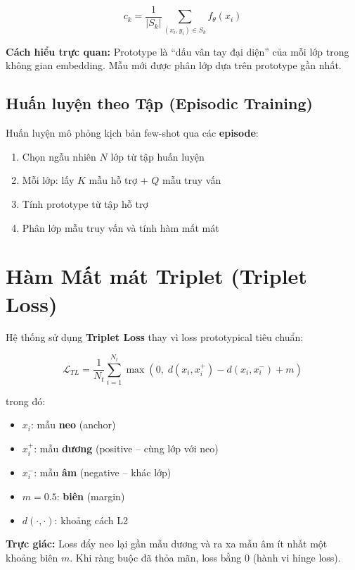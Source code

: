 \documentclass[12pt,a4paper]{report}
\begin{document}
\begin{equation}
    c_k = \frac{1}{|S_k|} \sum_{(x_i, y_i) \in S_k} f_\theta(x_i)
\end{equation}

\textbf{Cách hiểu trực quan:} Prototype là ``dấu vân tay đại diện'' của mỗi
lớp trong không gian embedding. Mẫu mới được phân lớp dựa trên prototype
gần nhất.

\subsection{Huấn luyện theo Tập (Episodic Training)}

Huấn luyện mô phỏng kịch bản few-shot qua các \textbf{episode}:

\begin{enumerate}
    \item Chọn ngẫu nhiên $N$ lớp từ tập huấn luyện
    \item Mỗi lớp: lấy $K$ mẫu hỗ trợ + $Q$ mẫu truy vấn
    \item Tính prototype từ tập hỗ trợ
    \item Phân lớp mẫu truy vấn và tính hàm mất mát
\end{enumerate}


\section{Hàm Mất mát Triplet (Triplet Loss)}
\label{sec:triplet_vi}

Hệ thống sử dụng \textbf{Triplet Loss} thay vì loss prototypical tiêu chuẩn:

\begin{equation}
    \mathcal{L}_{TL} = \frac{1}{N_t} \sum_{i=1}^{N_t}
    \max\left(0, \; d(x_i, x_i^+) - d(x_i, x_i^-) + m\right)
\end{equation}

trong đó:
\begin{itemize}
    \item $x_i$: mẫu \textbf{neo} (anchor)
    \item $x_i^+$: mẫu \textbf{dương} (positive -- cùng lớp với neo)
    \item $x_i^-$: mẫu \textbf{âm} (negative -- khác lớp)
    \item $m = 0.5$: \textbf{biên} (margin)
    \item $d(\cdot, \cdot)$: khoảng cách L2
\end{itemize}

\textbf{Trực giác:} Loss đẩy neo lại gần mẫu dương và ra xa mẫu âm ít nhất
một khoảng biên $m$. Khi ràng buộc đã thỏa mãn, loss bằng 0 (hành vi
hinge loss).
\end{document}
